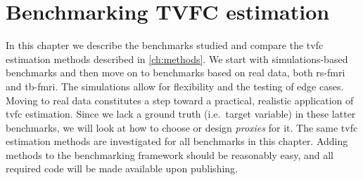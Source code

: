 \chapter{Benchmarking TVFC estimation}\label{ch:benchmarking}

In this chapter we describe the benchmarks studied and compare the \gls{tvfc} estimation methods described in \cref{ch:methods}.
We start with simulations-based benchmarks and then move on to benchmarks based on real data, both \gls{rs-fmri} and \gls{tb-fmri}.
The simulations allow for flexibility and the testing of edge cases.
Moving to real data constitutes a step toward a practical, realistic application of \gls{tvfc} estimation.
Since we lack a ground truth (i.e.~target variable) in these latter benchmarks, we will look at how to choose or design \emph{proxies} for it.
The same \gls{tvfc} estimation methods are investigated for all benchmarks in this chapter.
Adding methods to the benchmarking framework should be reasonably easy, and all required code will be made available upon publishing.
